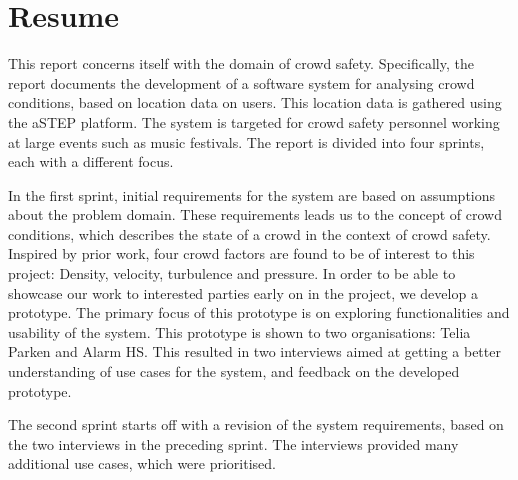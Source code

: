 \chapter*{Resume}

This report concerns itself with the domain of crowd safety. Specifically, the report documents the development of a software system for analysing crowd conditions, based on location data on users. This location data is gathered using the aSTEP platform. The system is targeted for crowd safety personnel working at large events such as music festivals. The report is divided into four sprints, each with a different focus.

In the first sprint, initial requirements for the system are based on assumptions about the problem domain. These requirements leads us to the concept of crowd conditions, which describes the state of a crowd in the context of crowd safety. Inspired by prior work, four crowd factors are found to be of interest to this project: Density, velocity, turbulence and pressure. In order to be able to showcase our work to interested parties early on in the project, we develop a prototype. The primary focus of this prototype is on exploring functionalities and usability of the system. This prototype is shown to two organisations: Telia Parken and Alarm HS. This resulted in two interviews aimed at getting a better understanding of use cases for the system, and feedback on the developed prototype.

The second sprint starts off with a revision of the system requirements, based on the two interviews in the preceding sprint. The interviews provided many additional use cases, which were prioritised.